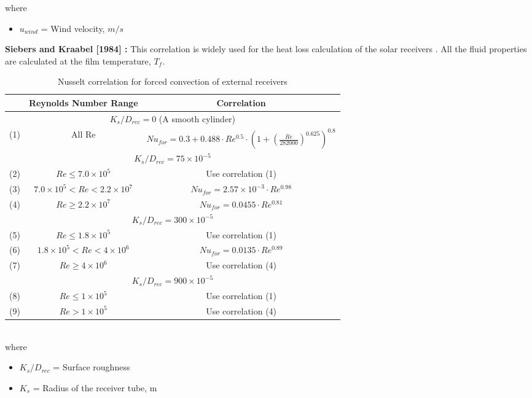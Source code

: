where 
\begin{itemize}
	\item $u_{wind}$ = Wind velocity, $m/s$
\end{itemize}
\textbf{Siebers and Kraabel [1984] \cite {Siebers.1984}:}
This correlation is widely used for the heat loss calculation of the solar receivers \cite{Christian.2012}. All the fluid properties are calculated at the film temperature, $T_f$. 
\begin{table}[h]
	\centering
	\begin{tabularx}{\textwidth}{|c|c|c|}
		\hline
		& Reynolds Number Range & Correlation\\
		\hline
		\multicolumn{3}{|c|}{$K_s/D_{rec}=0$ (A smooth cylinder)} \\
		\hline
		(1) & All Re & $Nu_{for}=0.3+0.488\cdot Re^{0.5}\cdot \left(1+\left(\frac{Re}{282000}\right)^{0.625}\right)^{0.8}$\\
		\hline
		\multicolumn{3}{|c|}{$K_s/D_{rec}=75\times10^{-5}$} \\
		\hline
		(2) & $Re\le 7.0\times10^5$ & Use correlation (1) \\
		\hline
		(3) & $7.0\times10^5<Re<2.2\times10^7$ & $Nu_{for}=2.57\times10^{-3}\cdot Re^{0.98}$ \\
		\hline
		(4) & $Re\ge2.2\times10^7$ & $Nu_{for}=0.0455\cdot Re^{0.81}$ \\
		\hline
		\multicolumn{3}{|c|}{$K_s/D_{rec}=300\times10^{-5}$} \\
		\hline
		(5) & $Re\le 1.8\times10^5$ & Use correlation (1) \\
		\hline
		(6) & $1.8\times10^5<Re<4\times10^6$ & $Nu_{for}=0.0135\cdot Re^{0.89}$ \\
		\hline
		(7) & $Re\ge4\times10^6$ & Use correlation (4) \\
		\hline
		\multicolumn{3}{|c|}{$K_s/D_{rec}=900\times10^{-5}$} \\
		\hline
		(8) & $Re\le 1\times10^5 $ & Use correlation (1) \\
		\hline
		(9) & $Re>1\times10^5$ & Use correlation (4) \\
		\hline
	\end{tabularx}
	\caption{Nusselt correlation for forced convection of external receivers \cite{Siebers.1984}}
	\label{siebers_forced_external_convection}
\end{table}\\
where 
\begin{itemize}
	\item $K_s/D_{rec}$ = Surface roughness
	\item $K_s$ = Radius of the receiver tube, m
\end{itemize}

